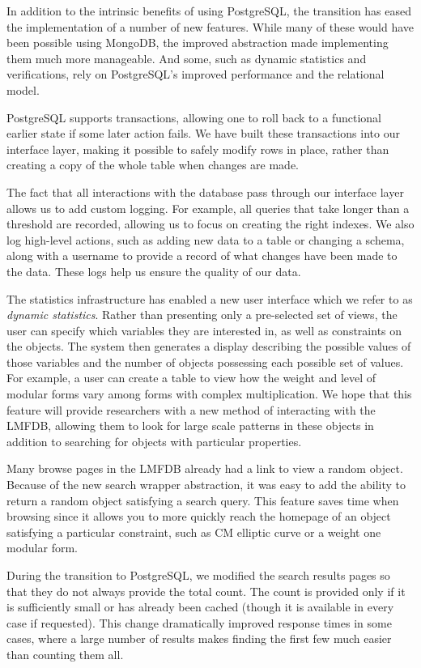 \documentclass{amsart}
\begin{document}
In addition to the intrinsic benefits of using PostgreSQL, the transition has eased the implementation of a number of new features.
While many of these would have been possible using MongoDB, the improved abstraction made implementing them much more manageable.
And some, such as dynamic statistics and verifications, rely on PostgreSQL's improved performance and the relational model.

PostgreSQL supports transactions, allowing one to roll back to a functional earlier state if some later action fails.
We have built these transactions into our interface layer, making it possible to safely modify rows in place, rather than creating a copy of the whole table when changes are made.

The fact that all interactions with the database pass through our interface layer allows us to add custom logging.
For example, all queries that take longer than a threshold are recorded, allowing us to focus on creating the right indexes.
We also log high-level actions, such as adding new data to a table or changing a schema, along with a username to provide a record of what changes have been made to the data.
These logs help us ensure the quality of our data.

The statistics infrastructure has enabled a new user interface which we refer to as \emph{dynamic statistics}.
Rather than presenting only a pre-selected set of views, the user can specify which variables they are interested in, as well as constraints on the objects.
The system then generates a display describing the possible values of those variables and the number of objects possessing each possible set of values.
For example, a user can create a table to view how the weight and level of modular forms vary among forms with complex multiplication.
We hope that this feature will provide researchers with a new method of interacting with the LMFDB, allowing them to look for large scale patterns in these objects in addition to searching for objects with particular properties.

Many browse pages in the LMFDB already had a link to view a random object.
Because of the new search wrapper abstraction, it was easy to add the ability to return a random object satisfying a search query.
This feature saves time when browsing since it allows you to more quickly reach the homepage of an object satisfying a particular constraint, such as CM elliptic curve or a weight one modular form.

During the transition to PostgreSQL, we modified the search results pages so that they do not always provide the total count.
The count is provided only if it is sufficiently small or has already been cached (though it is available in every case if requested).
This change dramatically improved response times in some cases, where a large number of results makes finding the first few much easier than counting them all.
\end{document}
